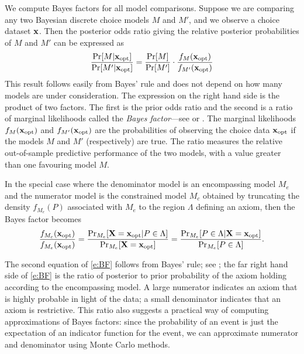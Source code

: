 \documentclass[11pt,letter]{article}
\begin{document}
We compute Bayes factors for all model comparisons.
Suppose we are comparing any two Bayesian discrete choice models $M$ and $M'$, and we observe a choice dataset ${\bf x}$.
Then the posterior odds ratio giving the relative posterior probabilities of $M$ and $M'$ can be expressed as
\[
  \frac{\Pr[M|{\bf x}_\mathrm{opt}]}{\Pr[M'|{\bf x}_\mathrm{opt}]} = \frac{\Pr[M]}{\Pr[M']}
  \cdot
  \frac{f_{M}({\bf x}_\mathrm{opt})}{f_{M'}({\bf x}_\mathrm{opt})}
\]
This result follows easily from Bayes' rule and does not depend on how many models are under consideration.
The expression on the right hand side is the product of two factors.
The first is the prior odds ratio and the second is a ratio of marginal likelihoods called the {\em Bayes factor}---see  or .
The marginal likelihoods $f_{M}({\bf x}_\mathrm{opt})$ and $f_{M'}({\bf x}_\mathrm{opt})$ are the probabilities of observing the choice data ${\bf x}_\mathrm{opt}$ if the models $M$ and $M'$ (respectively) are true.
The ratio measures the relative out-of-sample predictive performance of the two models, with a value greater t{}han one favouring model $M$.

In the special case where the denominator model is an encompassing model $M_e$ and the numerator model is the constrained model $M_c$ obtained by truncating the density $f_{M_e}(P)$ associated with $M_e$ to the region $\Lambda$ defining an axiom, then the Bayes factor becomes
\begin{equation}\label{e:BF}
  \frac{f_{M_c}({\bf x}_\mathrm{opt})}{f_{M_e}({\bf x}_\mathrm{opt})} =
  \frac{\Pr_{M_e}[{\bf X} = {\bf x}_\mathrm{opt}|P \in \Lambda]}{\Pr_{M_e}[{\bf X} = {\bf x}_\mathrm{opt}]} = \frac{\Pr_{M_e}[P \in \Lambda|{\bf X} = {\bf x}_\mathrm{opt}]}{\Pr_{M_e}[P \in \Lambda]}.
\end{equation}

The second equation of \eqref{e:BF} follows from Bayes' rule; see ; the far right hand side of \eqref{e:BF} is the ratio of posterior to prior probability of the axiom holding according to the encompassing model.{}
A large numerator indicates an axiom that is highly probable in light of the data; a small denominator indicates that an axiom is restrictive.
This ratio also suggests a practical way of computing approximations of Bayes factors: since the probability of an event is just the expectation of an indicator function for the event, we can approximate numerator and denominator using Monte Carlo methods.
\end{document}
